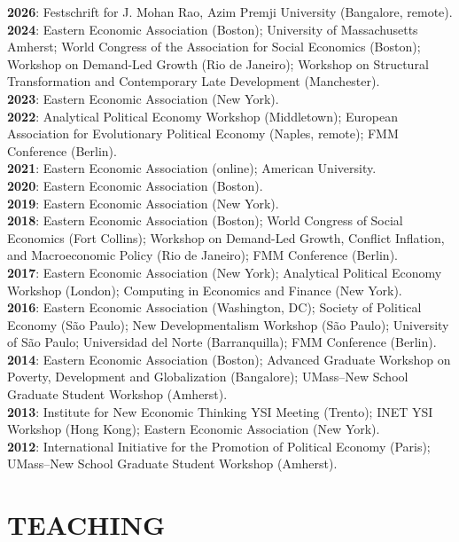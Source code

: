 \documentclass[10pt]{article}
\begin{document}
\textbf{2026}: Festschrift for J. Mohan Rao, Azim Premji University
(Bangalore, remote).\\
\textbf{2024}: Eastern Economic Association (Boston); University of
Massachusetts Amherst; World Congress of the Association for Social
Economics (Boston); Workshop on Demand-Led Growth (Rio de Janeiro);
Workshop on Structural Transformation and Contemporary Late
Development (Manchester).\\
\textbf{2023}: Eastern Economic Association (New York).\\
\textbf{2022}: Analytical Political Economy Workshop (Middletown);
European Association for Evolutionary Political Economy (Naples,
remote); FMM Conference (Berlin).\\
\textbf{2021}: Eastern Economic Association (online); American
University.\\
\textbf{2020}: Eastern Economic Association (Boston).\\
\textbf{2019}: Eastern Economic Association (New York).\\
\textbf{2018}: Eastern Economic Association (Boston); World Congress
of Social Economics (Fort Collins); Workshop on Demand-Led Growth,
Conflict Inflation, and Macroeconomic Policy (Rio de Janeiro); FMM
Conference (Berlin).\\
\textbf{2017}: Eastern Economic Association (New York); Analytical
Political Economy Workshop (London); Computing in Economics and
Finance (New York).\\
\textbf{2016}: Eastern Economic Association (Washington, DC); Society
of Political Economy (S\~ao Paulo); New Developmentalism Workshop
(S\~ao Paulo); University of S\~ao Paulo; Universidad del Norte
(Barranquilla); FMM Conference (Berlin).\\
\textbf{2014}: Eastern Economic Association (Boston); Advanced Graduate
Workshop on Poverty, Development and Globalization (Bangalore);
UMass--New School Graduate Student Workshop (Amherst).\\
\textbf{2013}: Institute for New Economic Thinking YSI Meeting
(Trento); INET YSI Workshop (Hong Kong); Eastern Economic Association
(New York).\\
\textbf{2012}: International Initiative for the Promotion of Political
Economy (Paris); UMass--New School Graduate Student Workshop (Amherst).

\section{TEACHING}
\end{document}
